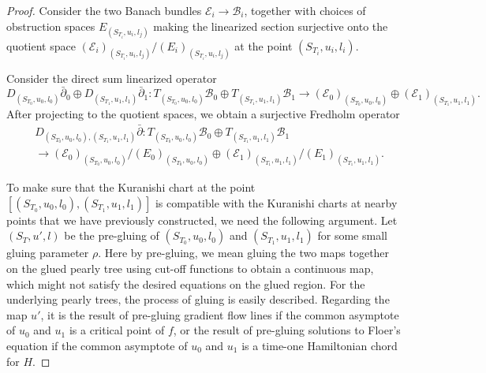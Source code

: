 \documentclass{amsart}
\numberwithin{equation}{section}
\numberwithin{figure}{section}
\begin{document}
\begin{proof}
	 Consider the two Banach bundles $\mathcal{E}_{i} \to \mathcal{B}_{i}$, together with choices of obstruction spaces $E_{(S_{T_{i}}, u_{i}, l_{j})}$ making the linearized section surjective onto the quotient space $(\mathcal{E}_{i})_{(S_{T_{i}}, u_{i}, l_{j})}/(E_{i})_{(S_{T_{i}}, u_{i}, l_{j})}$ at the point $(S_{T_{i}}, u_{i}, l_{i})$. \par
	Consider the direct sum linearized operator
\begin{equation}
D_{(S_{T_{0}}, u_{0}, l_{0})}\bar{\partial}_{0} \oplus D_{(S_{T_{1}}, u_{1}, l_{1})}\bar{\partial}_{1}: T_{(S_{T_{0}}, u_{0}, l_{0})}\mathcal{B}_{0} \oplus T_{(S_{T_{1}}, u_{1}, l_{1})}\mathcal{B}_{1} \to (\mathcal{E}_{0})_{(S_{T_{0}}, u_{0}, l_{0})} \oplus (\mathcal{E}_{1})_{(S_{T_{1}}, u_{1}, l_{1})}.
\end{equation}
After projecting to the quotient spaces, we obtain a surjective Fredholm operator
\begin{equation}
\begin{split}
&D_{(S_{T_{0}}, u_{0}, l_{0}), (S_{T_{1}}, u_{1}, l_{1})}\bar{\partial}:
T_{(S_{T_{0}}, u_{0}, l_{0})}\mathcal{B}_{0} \oplus T_{(S_{T_{1}}, u_{1}, l_{1})}\mathcal{B}_{1}\\
&\to (\mathcal{E}_{0})_{(S_{T_{0}}, u_{0}, l_{0})}/(E_{0})_{(S_{T_{0}}, u_{0}, l_{0})} \oplus (\mathcal{E}_{1})_{(S_{T_{1}}, u_{1}, l_{1})}/(E_{1})_{(S_{T_{1}}, u_{1}, l_{1})}.
\end{split}
\end{equation}\par
	To make sure that the Kuranishi chart at the point $[(S_{T_{0}}, u_{0}, l_{0}), (S_{T_{1}}, u_{1}, l_{1})]$ is compatible with the Kuranishi charts at nearby points that we have previously constructed, we need the following argument. Let $(S_{T}, u', l)$ be the pre-gluing of $(S_{T_{0}}, u_{0}, l_{0})$ and $(S_{T_{1}}, u_{1}, l_{1})$ for some small gluing parameter $\rho$. Here by pre-gluing, we mean gluing the two maps together on the glued pearly tree using cut-off functions to obtain a continuous map, which might not satisfy the desired equations on the glued region. For the underlying pearly trees, the process of gluing is easily described. Regarding the map $u'$, it is the result of pre-gluing gradient flow lines if the common asymptote of $u_{0}$ and $u_{1}$ is a critical point of $f$, or the result of pre-gluing solutions to Floer's equation if the common asymptote of $u_{0}$ and $u_{1}$ is a time-one Hamiltonian chord for $H$. \par

\end{proof}
\end{document}
